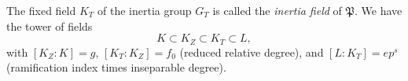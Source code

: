 The fixed field $K_T$ of the inertia group $G_T$ is called the \textit{inertia field} of $\mathfrak{P}$. We have the tower of fields
$$K \subset K_Z \subset K_T \subset L,$$
with $[K_Z:K] = g$, $[K_T:K_Z] = f_0$ (reduced relative degree), and $[L:K_T] = e p^s$ (ramification index times inseparable degree).
